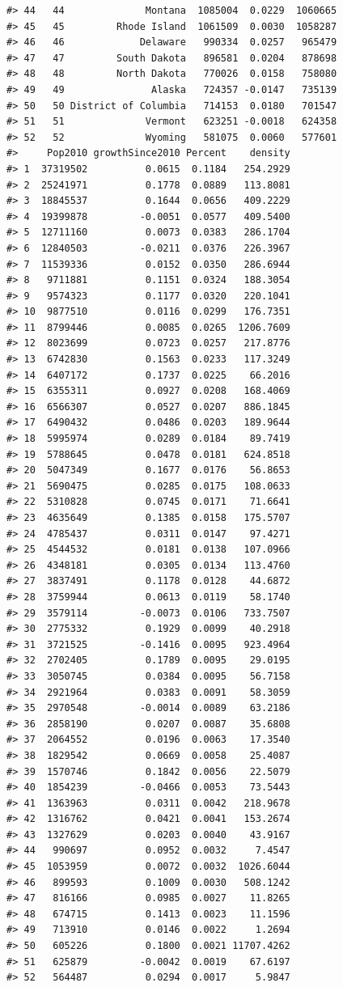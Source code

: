 \documentclass[
]{book}
\begin{document}
\begin{verbatim}
#> 44   44              Montana  1085004  0.0229  1060665
#> 45   45         Rhode Island  1061509  0.0030  1058287
#> 46   46             Delaware   990334  0.0257   965479
#> 47   47         South Dakota   896581  0.0204   878698
#> 48   48         North Dakota   770026  0.0158   758080
#> 49   49               Alaska   724357 -0.0147   735139
#> 50   50 District of Columbia   714153  0.0180   701547
#> 51   51              Vermont   623251 -0.0018   624358
#> 52   52              Wyoming   581075  0.0060   577601
#>     Pop2010 growthSince2010 Percent    density
#> 1  37319502          0.0615  0.1184   254.2929
#> 2  25241971          0.1778  0.0889   113.8081
#> 3  18845537          0.1644  0.0656   409.2229
#> 4  19399878         -0.0051  0.0577   409.5400
#> 5  12711160          0.0073  0.0383   286.1704
#> 6  12840503         -0.0211  0.0376   226.3967
#> 7  11539336          0.0152  0.0350   286.6944
#> 8   9711881          0.1151  0.0324   188.3054
#> 9   9574323          0.1177  0.0320   220.1041
#> 10  9877510          0.0116  0.0299   176.7351
#> 11  8799446          0.0085  0.0265  1206.7609
#> 12  8023699          0.0723  0.0257   217.8776
#> 13  6742830          0.1563  0.0233   117.3249
#> 14  6407172          0.1737  0.0225    66.2016
#> 15  6355311          0.0927  0.0208   168.4069
#> 16  6566307          0.0527  0.0207   886.1845
#> 17  6490432          0.0486  0.0203   189.9644
#> 18  5995974          0.0289  0.0184    89.7419
#> 19  5788645          0.0478  0.0181   624.8518
#> 20  5047349          0.1677  0.0176    56.8653
#> 21  5690475          0.0285  0.0175   108.0633
#> 22  5310828          0.0745  0.0171    71.6641
#> 23  4635649          0.1385  0.0158   175.5707
#> 24  4785437          0.0311  0.0147    97.4271
#> 25  4544532          0.0181  0.0138   107.0966
#> 26  4348181          0.0305  0.0134   113.4760
#> 27  3837491          0.1178  0.0128    44.6872
#> 28  3759944          0.0613  0.0119    58.1740
#> 29  3579114         -0.0073  0.0106   733.7507
#> 30  2775332          0.1929  0.0099    40.2918
#> 31  3721525         -0.1416  0.0095   923.4964
#> 32  2702405          0.1789  0.0095    29.0195
#> 33  3050745          0.0384  0.0095    56.7158
#> 34  2921964          0.0383  0.0091    58.3059
#> 35  2970548         -0.0014  0.0089    63.2186
#> 36  2858190          0.0207  0.0087    35.6808
#> 37  2064552          0.0196  0.0063    17.3540
#> 38  1829542          0.0669  0.0058    25.4087
#> 39  1570746          0.1842  0.0056    22.5079
#> 40  1854239         -0.0466  0.0053    73.5443
#> 41  1363963          0.0311  0.0042   218.9678
#> 42  1316762          0.0421  0.0041   153.2674
#> 43  1327629          0.0203  0.0040    43.9167
#> 44   990697          0.0952  0.0032     7.4547
#> 45  1053959          0.0072  0.0032  1026.6044
#> 46   899593          0.1009  0.0030   508.1242
#> 47   816166          0.0985  0.0027    11.8265
#> 48   674715          0.1413  0.0023    11.1596
#> 49   713910          0.0146  0.0022     1.2694
#> 50   605226          0.1800  0.0021 11707.4262
#> 51   625879         -0.0042  0.0019    67.6197
#> 52   564487          0.0294  0.0017     5.9847
\end{verbatim}
\end{document}

